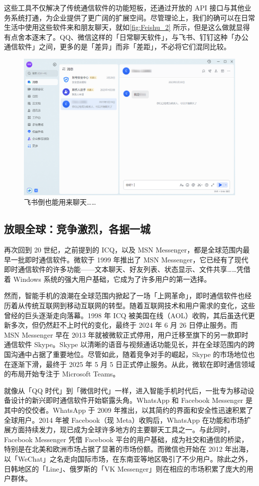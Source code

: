 这些工具不仅解决了传统通信软件的功能短板，还通过开放的 API 接口与其他业务系统打通，为企业提供了更广阔的扩展空间。尽管理论上，我们的确可以在日常生活中使用这些软件来和朋友聊天，就如\autoref{fig:Feishu_2} 所示，但是这么做就显得有点舍本逐末了。QQ、微信这样的「日常聊天软件」，与飞书、钉钉这种「办公通信软件」之间，更多的是「差异」而非「差距」，不必将它们混同比较。

\begin{figure}[htb!]
  \centering
  \includegraphics[width=.7\textwidth]{assets/software/Feishu_1.png}
  \caption{飞书倒也能用来聊天……}
  \label{fig:Feishu_2}
\end{figure}

\subsection{放眼全球：竞争激烈，各据一城}

再次回到 20 世纪，之前提到的 ICQ，以及 MSN Messenger，都是全球范围内最早一批即时通信软件。微软于 1999 年推出了 MSN Messenger，它已经有了现代即时通信软件的许多功能——文本聊天、好友列表、状态显示、文件共享……凭借着 Windows 系统的强大用户基础，它成为了许多用户的第一选择。

然而，智能手机的浪潮在全球范围内掀起了一场「上网革命」，即时通信软件也经历着从传统互联网到移动互联网的转型。随着互联网技术和用户需求的变化，这些曾经的巨头逐渐走向落幕。1998 年 ICQ 被美国在线（AOL）收购，其后虽迭代更新多次，但仍然赶不上时代的变化，最终于 2024 年 6 月 26 日停止服务。而 MSN Messenger 早在 2013 年就被微软正式停用，用户迁移至旗下的另一款即时通信软件 Skype。Skype 以清晰的语音与视频通话功能见长，并在全球范围内的跨国沟通中占据了重要地位。尽管如此，随着竞争对手的崛起，Skype 的市场地位也在逐渐下滑，最终于 2025 年 5 月 5 日正式停止服务。从此，微软在即时通信领域的布局开始专注于 Microsoft Teams。

就像从「QQ 时代」到「微信时代」一样，进入智能手机时代后，一批专为移动设备设计的新兴即时通信软件开始崭露头角。WhatsApp 和 Facebook Messenger 是其中的佼佼者。WhatsApp 于 2009 年推出，以其简约的界面和安全性迅速积累了全球用户。2014 年被 Facebook（现 Meta）收购后，WhatsApp 在功能和市场扩展方面持续发力，现已成为全球许多地方的主要聊天工具之一。与此同时，Facebook Messenger 凭借 Facebook 平台的用户基础，成为社交和通信的桥梁，特别是在北美和欧洲市场占据了显著的市场份额。而微信也开始在 2012 年出海，以「WeChat」之名走向国际市场，在东南亚等地区吸引了不少用户。除此之外，日韩地区的「Line」、俄罗斯的「VK Messenger」则在相应的市场积累了庞大的用户群体。


